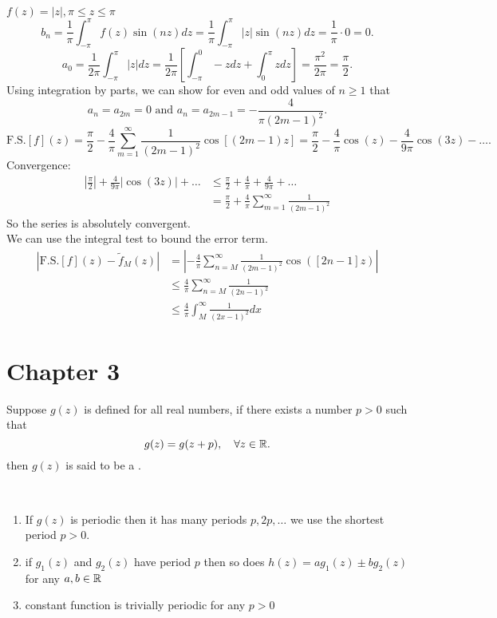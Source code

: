 \documentclass[class=article,crop=false]{standalone}
\begin{document}
\begin{eg}[]
	$f(z)=|z|, \pi\leq z \leq \pi$
	\[
		b_n=\frac{1}{\pi} \int_{ -\pi}^{ \pi} f(z) \sin(nz ) dz = \frac{1}{\pi} \int_{ -\pi}^{ \pi} |z|\sin(nz )dz = \frac{1}{\pi}\cdot 0 = 0  
	.\] 
\[
a_0 = \frac{1}{2\pi} \int_{ -\pi}^{ \pi} |z| dz = \frac{1}{2\pi} \left[ \int_{ -\pi}^{0} -z dz + \int_{ 0}^{ \pi} z dz   \right]  = \frac{\pi^2}{2\pi} = \frac{\pi}{2}
.\] 
Using integration by parts, we can show for even and odd values of $n \geq 1$ that 
 \[
	 a_n=a_{2m} = 0 \text{ and } a_n = a_{2m-1} = -\frac{4}{\pi(2m-1)^2} 
.\] 
\[
	\text{F.S.} [f](z) = \frac{\pi}{2} -\frac{4}{\pi} \sum_{ m=1}^{\infty} \frac{1}{(2m-1)^2}\cos [(2m-1)z] = \frac{\pi}{2} - \frac{4}{\pi} \cos(z ) - \frac{4}{9\pi}\cos(3z ) - \ldots
.\] 
Convergence:
 \begin{align*}
	 \left| \frac{\pi}{2} \right| + \frac{4}{9\pi} |\cos(3z)| + \ldots &\leq \frac{\pi}{2} + \frac{4}{\pi} + \frac{4}{9\pi} + \ldots\\
									   &= \frac{\pi}{2} + \frac{4}{\pi} \sum_{ m=1}^{\infty} \frac{1}{(2m-1)^2} 
 \end{align*}
So the series is absolutely convergent. \\

We can use the integral test to bound the error term. 
\begin{align*}
	|\text{F.S.} [f](z) -\tilde{f}_M (z) | &= \left| -\frac{4}{\pi} \sum_{ n=M}^{\infty} \frac{1}{(2m-1)^2} \cos([2n-1]z ) \right| \\
	&\leq \frac{4}{\pi} \sum_{ n=M}^{\infty} \frac{1}{(2n-1)^2} \\
	&\leq \frac{4}{\pi} \int_{M}^{\infty} \frac{1}{(2x-1)^2} dx 
\end{align*}
 
\end{eg}

\newpage
\section{Chapter 3}
\begin{defn}[Periodicity]
	Suppose $g(z)$ is defined for all real numbers, if there exists a number  $p>0$ such that 
	 \[
		 g(z) = g(z+p), \quad \forall z \in \mathbb{R}
	.\] 
	then $g(z)$ is said to be a  . 
\end{defn}
\begin{note}[]
~\begin{enumerate}[label=\arabic*)]
	\item If $g(z)$ is periodic then it has many periods $p,2p,\ldots$ we use the shortest period $p>0$.
	\item if  $g_1(z)$ and $g_2(z)$ have period $p$ then so does  $h(z) = ag_1(z) \pm bg_2(z) $ for any $a,b \in \mathbb{R}$
	\item constant function is trivially periodic for any $p>0$
\end{enumerate}
\end{note}
\end{document}
